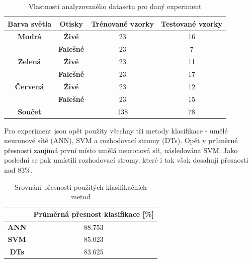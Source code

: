 \capstartfalse
\begin{table}[!htbp]
\centering
\begin{tabular}{|c|c|c|c|}
\hline
\textbf{Barva světla} & \textbf{Otisky}  & \textbf{Trénované vzorky} & \textbf{Testované vzorky} \\ \hline
\textbf{Modrá}        & \textbf{Živé}    & 23                        & 16                        \\ \hline
\textbf{}             & \textbf{Falešné} & 23                        & 7                         \\ \hline
\textbf{Zelená}       & \textbf{Živé}    & 23                        & 11                        \\ \hline
\textbf{}             & \textbf{Falešné} & 23                        & 17                        \\ \hline
\textbf{Červená}      & \textbf{Živé}    & 23                        & 12                        \\ \hline
\textbf{}             & \textbf{Falešné} & 23                        & 15                        \\ \hline
\textbf{Součet}       & \textbf{}        & 138                       & 78                        \\ \hline
\end{tabular}
\caption{Vlastnosti analyzovaného datasetu pro daný experiment}
\end{table}
\capstarttrue

Pro experiment jsou opět použity všechny tři metody klasifikace - umělé neuronové sítě (ANN), SVM a rozhodovací stromy (DTs). Opět v průměrné přesnosti zaujímá první místo umělá neuronová síť, následována SVM. Jako poslední se pak umístili rozhodovací stromy, které i tak však dosahují přesnosti nad 83\%.

\capstartfalse
\begin{table}[!htbp]
\centering
\begin{tabular}{|c|c|}
\hline
                             & \textbf{Průměrná přesnost klasifikace {[}\%{]}} \\ \hline
\textbf{ANN} & 88.753                                         \\ \hline
\textbf{SVM}                 & 85.023                                         \\ \hline
\textbf{DTs}   & 83.625                                         \\ \hline
\end{tabular}
\caption{Srovnání přesnosti použitých klasifikačních metod}
\end{table}
\capstarttrue

